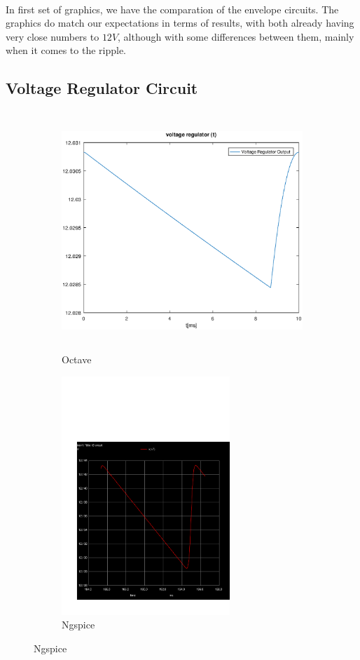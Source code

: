 \paragraph{}
In first set of graphics, we have the comparation of the envelope circuits. The graphics do match our expectations in terms of results, with both already having very close numbers to $12V$, although with some differences between them, mainly when it comes to the ripple.


\subsection{Voltage Regulator Circuit}
\label{subsec:second_topic_error}
\begin{figure}[H]

\begin{subfigure}{0.5\textwidth}
\includegraphics[width=1.1\linewidth, height=9cm]{output.eps} 
\caption{Octave}
\label{fig:theosecondcompare}
\end{subfigure}
\begin{subfigure}{0.5\textwidth}
  \includegraphics[trim= 0cm 0cm 0cm 10cm, clip, width=1.1\linewidth, height=9cm]{trans2aux.pdf}
\caption{Ngspice}
\label{fig:simsecondcompare}
\end{subfigure}

\label{fig:compar2}
\end{figure}

